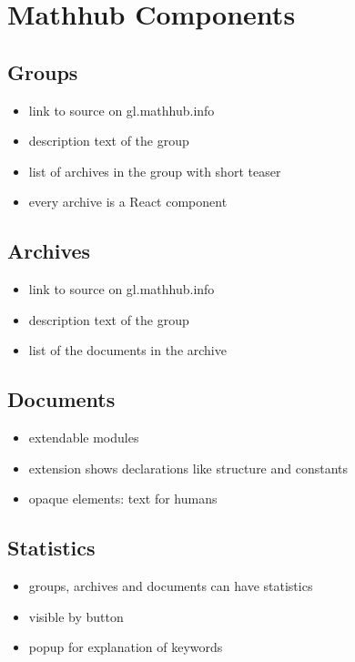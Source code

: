 \documentclass[11pt,a4paper]{article}
\begin{document}
\section{Mathhub Components}
\subsection{Groups}
\begin{itemize}
\item link to source on gl.mathhub.info
\item description text of the group
\item list of archives in the group with short teaser
\item every archive is a React component
\end{itemize}	 
	
\subsection{Archives}
\begin{itemize}
\item link to source on gl.mathhub.info
\item description text of the group
\item list of the documents in the archive
\end{itemize}	 

\subsection{Documents}
\begin{itemize}
\item extendable modules
\item extension shows declarations like structure and constants
\item opaque elements: text for humans
\end{itemize}

\subsection{Statistics}
\begin{itemize}
\item groups, archives and documents can have statistics
\item visible by button
\item popup for explanation of keywords
\end{itemize}
\end{document}
